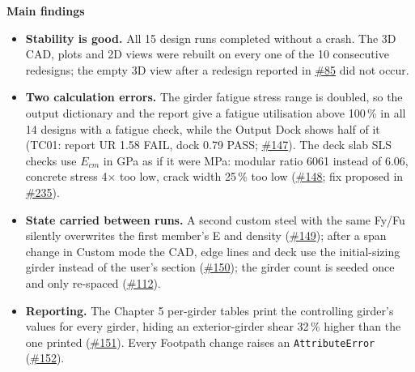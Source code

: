 \documentclass[11pt,a4paper]{article}
\newcommand{\issue}[1]{\href{https://github.com/Nidhikhare12/OsdagBridge/issues/#1}{\##1}}
\begin{document}
\textbf{Main findings}
\begin{itemize}
\item \textbf{Stability is good.} All 15 design runs completed without a crash. The 3D CAD, plots and 2D views were rebuilt on
  every one of the 10 consecutive redesigns; the empty 3D view after a redesign reported in \issue{85} did not occur.
\item \textbf{Two calculation errors.} The girder fatigue stress range is doubled, so the output dictionary and the report give a
  fatigue utilisation above 100\,\% in all 14 designs with a fatigue check, while the Output Dock shows half of it
  (TC01: report UR 1.58 FAIL, dock 0.79 PASS; \issue{147}). The deck slab SLS checks use $E_{cm}$ in GPa as if it were MPa:
  modular ratio 6061 instead of 6.06, concrete stress 4$\times$ too low, crack width 25\,\% too low (\issue{148}; fix proposed
  in \issue{235}).
\item \textbf{State carried between runs.} A second custom steel with the same Fy/Fu silently overwrites the first member's E
  and density (\issue{149}); after a span change in Custom mode the CAD, edge lines and deck use the initial-sizing girder
  instead of the user's section (\issue{150}); the girder count is seeded once and only re-spaced (\issue{112}).
\item \textbf{Reporting.} The Chapter 5 per-girder tables print the controlling girder's values for every girder, hiding an
  exterior-girder shear 32\,\% higher than the one printed (\issue{151}). Every Footpath change raises an
  \texttt{AttributeError} (\issue{152}).
\end{itemize}
\end{document}
